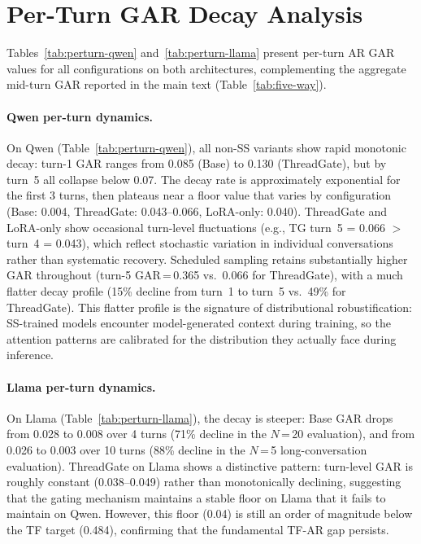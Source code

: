 



\section{Per-Turn GAR Decay Analysis}\label{sec:appendix-perturn-detail}

Tables~\ref{tab:perturn-qwen} and~\ref{tab:perturn-llama} present per-turn AR GAR values for all configurations on both architectures, complementing the aggregate mid-turn GAR reported in the main text (Table~\ref{tab:five-way}).

\paragraph{Qwen per-turn dynamics.} On Qwen (Table~\ref{tab:perturn-qwen}), all non-SS variants show rapid monotonic decay: turn-1 GAR ranges from 0.085 (Base) to 0.130 (ThreadGate), but by turn~5 all collapse below 0.07. The decay rate is approximately exponential for the first 3 turns, then plateaus near a floor value that varies by configuration (Base: 0.004, ThreadGate: 0.043--0.066, LoRA-only: 0.040). ThreadGate and LoRA-only show occasional turn-level fluctuations (e.g., TG turn~5 = 0.066 $>$ turn~4 = 0.043), which reflect stochastic variation in individual conversations rather than systematic recovery. Scheduled sampling retains substantially higher GAR throughout (turn-5 GAR\,=\,0.365 vs.\ 0.066 for ThreadGate), with a much flatter decay profile (15\% decline from turn~1 to turn~5 vs.\ 49\% for ThreadGate). This flatter profile is the signature of distributional robustification: SS-trained models encounter model-generated context during training, so the attention patterns are calibrated for the distribution they actually face during inference.

\paragraph{Llama per-turn dynamics.} On Llama (Table~\ref{tab:perturn-llama}), the decay is steeper: Base GAR drops from 0.028 to 0.008 over 4 turns (71\% decline in the $N$\,=\,20 evaluation), and from 0.026 to 0.003 over 10 turns (88\% decline in the $N$\,=\,5 long-conversation evaluation). ThreadGate on Llama shows a distinctive pattern: turn-level GAR is roughly constant (0.038--0.049) rather than monotonically declining, suggesting that the gating mechanism maintains a stable floor on Llama that it fails to maintain on Qwen. However, this floor (0.04) is still an order of magnitude below the TF target (0.484), confirming that the fundamental TF-AR gap persists.

